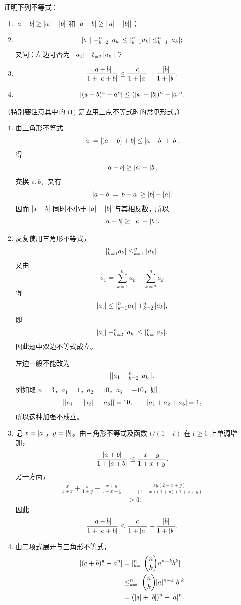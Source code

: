 \begin{xexercise}[5]
证明下列不等式：
\begin{enumerate}[label=(\arabic*)]
  \item $\lvert a-b\rvert\ge\lvert a\rvert-\lvert b\rvert$ 和 $\lvert a-b\rvert\ge\lvert\lvert a\rvert-\lvert b\rvert\rvert$；
  \item
  \[
    \lvert a_1\rvert-\relax_{k=2}^n\lvert a_k\rvert
    \le
    \lvert\relax_{k=1}^n a_k\rvert
    \le
    \relax_{k=1}^n\lvert a_k\rvert;
  \]
  又问：左边可否为 $\lvert\lvert a_1\rvert-\relax_{k=2}^n\lvert a_k\rvert\rvert$？
  \item
  \[
    \frac{\lvert a+b\rvert}{1+\lvert a+b\rvert}
    \le
    \frac{\lvert a\rvert}{1+\lvert a\rvert}+\frac{\lvert b\rvert}{1+\lvert b\rvert};
  \]
  \item
  \[
    \lvert(a+b)^n-a^n\rvert\le(\lvert a\rvert+\lvert b\rvert)^n-\lvert a\rvert^n.
  \]
\end{enumerate}
（特别要注意其中的 (1) 是应用三点不等式时的常见形式。）
\end{xexercise}
\begin{xsolution}
\begin{enumerate}[label=(\arabic*)]
  \item 由三角形不等式
  \[
    \lvert a\rvert=\lvert(a-b)+b\rvert\le\lvert a-b\rvert+\lvert b\rvert,
  \]
  得
  \[
    \lvert a-b\rvert\ge\lvert a\rvert-\lvert b\rvert.
  \]
  交换 $a,b$，又有
  \[
    \lvert a-b\rvert=\lvert b-a\rvert\ge\lvert b\rvert-\lvert a\rvert.
  \]
  因而 $\lvert a-b\rvert$ 同时不小于 $\lvert a\rvert-\lvert b\rvert$ 与其相反数，所以
  \[
    \lvert a-b\rvert\ge\lvert\lvert a\rvert-\lvert b\rvert\rvert.
  \]

  \item 反复使用三角形不等式，
  \[
    \lvert\relax_{k=1}^n a_k\rvert\le\relax_{k=1}^n\lvert a_k\rvert.
  \]
  又由
  \[
    a_1=\sum_{k=1}^n a_k-\sum_{k=2}^n a_k
  \]
  得
  \[
    \lvert a_1\rvert
    \le\lvert\relax_{k=1}^n a_k\rvert+\relax_{k=2}^n\lvert a_k\rvert,
  \]
  即
  \[
    \lvert a_1\rvert-\relax_{k=2}^n\lvert a_k\rvert
    \le\lvert\relax_{k=1}^n a_k\rvert.
  \]
  因此题中双边不等式成立。

  左边一般不能改为
  \[
    \lvert\lvert a_1\rvert-\relax_{k=2}^n\lvert a_k\rvert\rvert.
  \]
  例如取 $n=3$，$a_1=1$，$a_2=10$，$a_3=-10$，则
  \[
    \lvert\lvert a_1\rvert-\lvert a_2\rvert-\lvert a_3\rvert\rvert=19,
    \qquad
    \lvert a_1+a_2+a_3\rvert=1,
  \]
  所以这种加强不成立。

  \item 记 $x=\lvert a\rvert$，$y=\lvert b\rvert$。由三角形不等式及函数 $t/(1+t)$ 在 $t\ge0$ 上单调增加，
  \[
    \frac{\lvert a+b\rvert}{1+\lvert a+b\rvert}
    \le\frac{x+y}{1+x+y}.
  \]
  另一方面，
  \[
  \begin{aligned}
    \frac{x}{1+x}+\frac{y}{1+y}-\frac{x+y}{1+x+y}
    &=\frac{xy(2+x+y)}{(1+x)(1+y)(1+x+y)}\\
    &\ge0.
  \end{aligned}
  \]
  因此
  \[
    \frac{\lvert a+b\rvert}{1+\lvert a+b\rvert}
    \le\frac{\lvert a\rvert}{1+\lvert a\rvert}+\frac{\lvert b\rvert}{1+\lvert b\rvert}.
  \]

  \item 由二项式展开与三角形不等式，
  \[
  \begin{aligned}
    \lvert(a+b)^n-a^n\rvert
    &=\lvert\relax_{k=1}^n\binom{n}{k}a^{n-k}b^k\rvert\\
    &\le\relax_{k=1}^n\binom{n}{k}\lvert a\rvert^{n-k}\lvert b\rvert^k\\
    &=(\lvert a\rvert+\lvert b\rvert)^n-\lvert a\rvert^n.
  \end{aligned}
  \]
\end{enumerate}
\end{xsolution}


